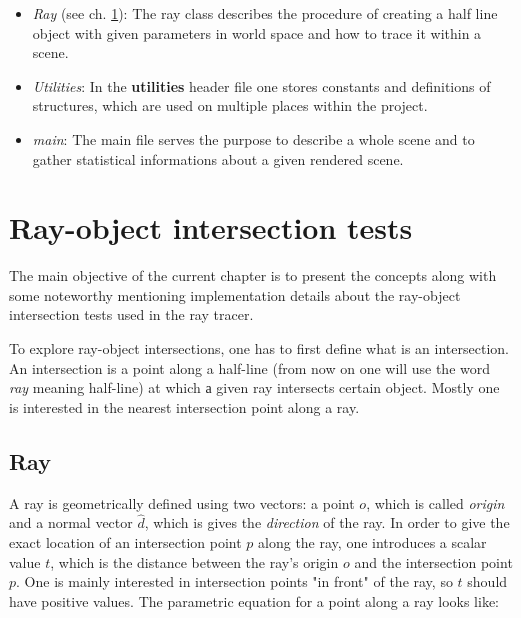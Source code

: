 \documentclass{article}
\begin{document}
\begin{itemize}
	\item \textit{Ray} (see ch. \ref{sec:isects}): The ray class describes the procedure of creating a half line object with given parameters in world space and how to trace it within a scene. 
	
	\item \textit{Utilities}: In the \textbf{utilities} header file one stores constants and definitions of structures, which are used on multiple places within the project. 
	
	\item \textit{main}: The main file serves the purpose to describe a whole scene and to gather statistical informations about a given rendered scene. 
		
\end{itemize}


\section{Ray-object intersection tests}
\label{sec:isects}
The main objective of the current chapter is to present the concepts along with some noteworthy mentioning implementation details about the ray-object intersection tests used in the ray tracer.

\vspace*{\baselineskip}

To explore ray-object intersections, one has to first define what is an intersection. An intersection is a point along a half-line (from now on one will use the word \textit{ray} meaning half-line) at which а given ray intersects certain object. Mostly one is interested in the nearest intersection point along a ray.

\subsection{Ray}

A ray is geometrically defined using two vectors: a point $o$, which is called \textit{origin} and a normal vector $\hat{d}$, which is gives the \textit{direction} of the ray. In order to give the exact location of an intersection point $p$ along the ray, one introduces a scalar value $t$, which is the distance between the ray's origin $o$ and the intersection point $p$. One is mainly interested in intersection points "in front" of the ray, so $t$ should have positive values. The parametric equation for a point along a ray looks like: \cite{rftgu}
\end{document}
